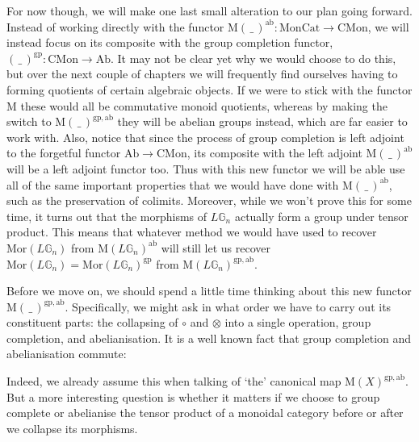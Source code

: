 For now though, we will make one last small alteration to our plan going forward. Instead of working directly with the functor $\mathrm{M}(\, \_ \,)^{\mathrm{ab}}: \mathrm{MonCat} \to \mathrm{CMon}$, we will instead focus on its composite with the group completion functor, $( \, \_ \, )^{\mathrm{gp}} : \mathrm{CMon} \to \mathrm{Ab}$. It may not be clear yet why we would choose to do this, but over the next couple of chapters we will frequently find ourselves having to forming quotients of certain algebraic objects. If we were to stick with the functor $\mathrm{M}$ these would all be commutative monoid quotients, whereas by making the switch to $\mathrm{M}(\, \_ \,)^{\mathrm{gp},\mathrm{ab}}$ they will be abelian groups instead, which are far easier to work with. Also, notice that since the process of group completion is left adjoint to the forgetful functor $\mathrm{Ab} \to \mathrm{CMon}$, its composite with the left adjoint $\mathrm{M}(\, \_ \,)^{\mathrm{ab}}$ will be a left adjoint functor too. Thus with this new functor we will be able use all of the same important properties that we would have done with $\mathrm{M}(\, \_ \,)^{\mathrm{ab}}$, such as the preservation of colimits. Moreover, while we won't prove this for some time, it turns out that the morphisms of $L\mathbb{G}_n$ actually form a group under tensor product. This means that whatever method we would have used to recover $\mathrm{Mor}(L\mathbb{G}_n)$ from $\mathrm{M}(L\mathbb{G}_n)^{\mathrm{ab}}$ will still let us recover $\mathrm{Mor}(L\mathbb{G}_n) = \mathrm{Mor}(L\mathbb{G}_n)^{\mathrm{gp}}$ from $\mathrm{M}(L\mathbb{G}_n)^{\mathrm{gp},\mathrm{ab}}$.

Before we move on, we should spend a little time thinking about this new functor $\mathrm{M}(\, \_ \,)^{\mathrm{gp},\mathrm{ab}}$. Specifically, we might ask in what order we have to carry out its constituent parts: the collapsing of $\circ$ and $\otimes$ into a single operation, group completion, and abelianisation. It is a well known fact that group completion and abelianisation commute:
\begin{eq*}  \end{eq*}
Indeed, we already assume this when talking of `the' canonical map $\mathrm{M}(X)^{\mathrm{gp},\mathrm{ab}}$. But a more interesting question is whether it matters if we choose to group complete or abelianise the tensor product of a monoidal category before or after we collapse its morphisms.

